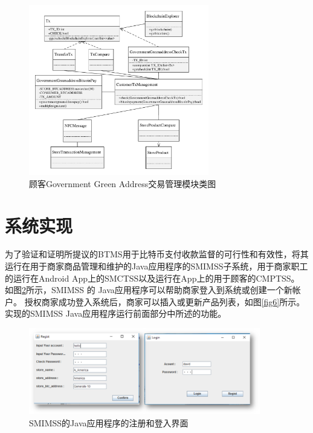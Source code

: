 	\begin{figure}[!htbp]
		\centering
		\includegraphics[width = 0.7\textwidth]{c6.pdf}
		\caption{顾客Government Green Address交易管理模块类图}\label{c6}
	\end{figure}

\section{系统实现}


为了验证和证明所提议的BTMS用于比特币支付收款监督的可行性和有效性，将其运行在用于商家商品管理和维护的Java应用程序的SMIMSS子系统，用于商家职工的运行在Android App上的SMCTSS以及运行在App上的用于顾客的CMPTSS。
如图\ref{fig5}所示，SMIMSS 的 Java应用程序可以帮助商家登入到系统或创建一个新帐户。 授权商家成功登入系统后，商家可以插入或更新产品列表，如图\ref{fig6}所示。实现的SMIMSS Java应用程序运行前面部分中所述的功能。

\begin{figure}[!htbp]
	\centering
	\includegraphics[width = 0.9\textwidth]{fig5.png}
	\caption{SMIMSS的Java应用程序的注册和登入界面}\label{fig5}
\end{figure}

